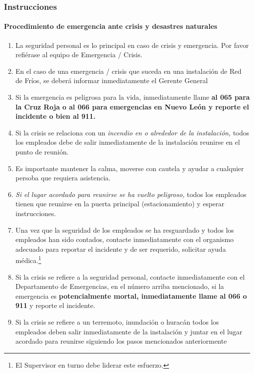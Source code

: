 \subsubsection{Instrucciones}
\paragraph{Procedimiento de emergencia ante crisis y desastres naturales}
\begin{enumerate}
	\item La seguridad personal es lo principal en caso de crisis y emergencia. Por favor refiérase al equipo de Emergencia / Crisis.
	\item En el caso de una emergencia / crisis que suceda en una instalación de Red de Fríos, se deberá informar inmediatamente el Gerente General
	\item Si la emergencia es peligrosa para la vida, inmediatamente llame \textbf{al 065 para la Cruz Roja o al 066 para emergencias en Nuevo León y reporte el incidente o bien al 911.}
	\item Si la crisis se relaciona con un \emph{incendio en o alrededor de la instalación,} todos los empleados debe de salir inmediatamente de la instalación reunirse en el punto de reunión.
	\item Es importante mantener la calma, moverse con cautela y ayudar a cualquier persoba que requiera asistencia.
	\item \emph{Si el lugar acordado para reunirse se ha vuelto peligroso,} todos los empleados tienen que reunirse en la puerta principal (estacionamiento) y esperar instrucciones.
	\item Una vez que la seguridad de los empleados se ha resguardado y todos los empleados han sido contados, contacte inmediatamente con el organismo adecuado para reportar el incidente y de ser requerido, solicitar ayuda médica.\footnote{El Supervisor en turno debe liderar este esfuerzo.}
	\item Si la crisis se refiere a la seguridad personal, contacte inmediatamente con el Departamento de Emergencias, en el número arriba mencionado, si la emergencia es \textbf{potencialmente mortal, inmediatamente llame al 066 o 911} y reporte el incidente.
	\item Si la crisis se refiere a un terremoto, inundación o huracán todos los empleados deben salir inmediatamente de la instalación y juntar en el lugar acordado para reunirse siguiendo los pasos mencionados anteriormente
\end{enumerate}



